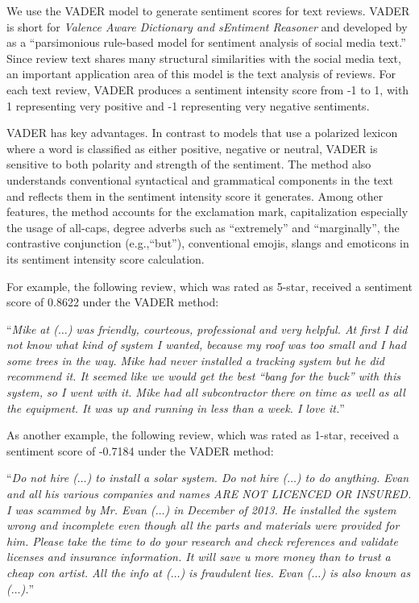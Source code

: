 \documentclass[msom,blindrev]{informs3}
\begin{document}
 We use the VADER model to generate sentiment scores for text reviews. VADER is short for \emph{Valence Aware Dictionary and sEntiment Reasoner} and developed by  \cite{hutto2014vader} as a ``parsimonious rule-based model for sentiment analysis of social media text.'' Since review text shares many structural similarities with the social media text, an important application area of this model is the text analysis of reviews. For each text review, VADER produces a sentiment intensity score from -1 to 1, with 1 representing very positive and -1 representing very negative sentiments.

VADER has key advantages. In contrast to models that use a polarized lexicon where a word is classified as either positive, negative or neutral, VADER is sensitive to both polarity and strength of the sentiment.  The method also understands conventional syntactical and grammatical components in the text and reflects them in the sentiment intensity score it generates. Among other features, the method accounts for the exclamation mark, capitalization especially the usage of all-caps, degree adverbs such as ``extremely'' and ``marginally'', the contrastive conjunction (e.g.,``but''), conventional emojis, slangs and emoticons in its sentiment intensity score calculation.


For example, the following review, which was rated as 5-star, received a sentiment score of 0.8622 under the VADER method:

``\textit{Mike at ($\ldots$) was friendly, courteous, professional and very helpful.  At first I did not know what kind of system I wanted, because my roof was too small and I had some trees in the way.  Mike had never installed a tracking system but he did recommend it.  It seemed like we would get the best ``bang for the buck'' with this system, so I went with it.  Mike had all subcontractor there on time as well as all the equipment.  It was up and running in less than a week.  I love it.}''

As another example, the following review, which was rated as 1-star, received a sentiment score of -0.7184 under the VADER method:

``\textit{Do not hire ($\ldots$)  to install a solar system. Do not hire ($\ldots$) to do anything. Evan and all his various companies and names  ARE NOT LICENCED OR INSURED. I was scammed by Mr. Evan ($\ldots$) in December of 2013. He installed the system wrong and incomplete even though all the parts and materials were provided for him. Please take the time to do your research and check references and validate licenses and insurance information. It will save u more money than to trust a cheap con artist. All the info at ($\ldots$)  is fraudulent lies. Evan ($\ldots$) is also known as ($\ldots$).}''
\end{document}
